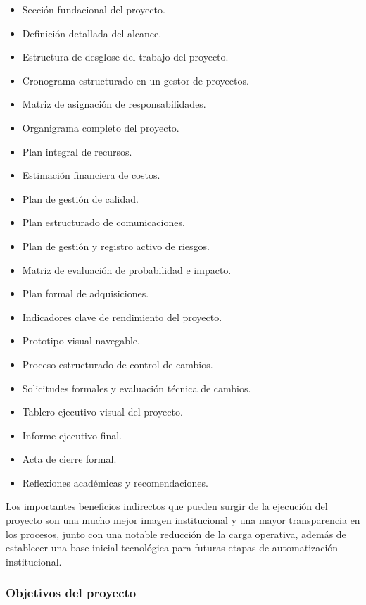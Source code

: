\documentclass[11pt,spanish]{article}
\begin{document}
\begin{itemize}
    \item Sección fundacional del proyecto.
    \item Definición detallada del alcance.
    \item Estructura de desglose del trabajo del proyecto.
    \item Cronograma estructurado en un gestor de proyectos.
    \item Matriz de asignación de responsabilidades.
    \item Organigrama completo del proyecto.
    \item Plan integral de recursos.
    \item Estimación financiera de costos.
    \item Plan de gestión de calidad.
    \item Plan estructurado de comunicaciones.
    \item Plan de gestión y registro activo de riesgos.
    \item Matriz de evaluación de probabilidad e impacto.
    \item Plan formal de adquisiciones.
    \item Indicadores clave de rendimiento del proyecto.
    \item Prototipo visual navegable.
    \item Proceso estructurado de control de cambios.
    \item Solicitudes formales y evaluación técnica de cambios.
    \item Tablero ejecutivo visual del proyecto.
    \item Informe ejecutivo final.
    \item Acta de cierre formal.
    \item Reflexiones académicas y recomendaciones.
\end{itemize}

Los importantes beneficios indirectos que pueden surgir de la ejecución del proyecto son una mucho mejor imagen institucional y una mayor transparencia en los procesos, junto con una notable reducción de la carga operativa, además de establecer una base inicial tecnológica para futuras etapas de automatización institucional.

\subsubsection{Objetivos del proyecto}
\end{document}
